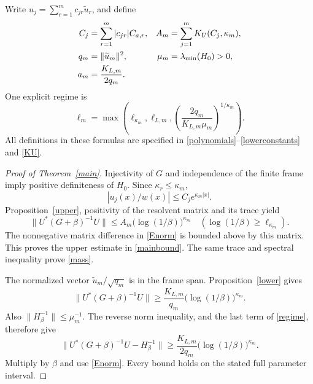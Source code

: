 \documentclass[11pt]{article}
\theoremstyle{remark}
\begin{document}
Write \(u_j=\sum_{r=1}^m c_{jr}\widetilde u_r\), and define
\begin{align}
 C_j&=\sum_{r=1}^m|c_{jr}|C_{a,r},&
 A_m&=\sum_{j=1}^mK_U(C_j,\kappa_m),\notag\\
 q_m&=\|\widetilde u_m\|^2,&
 \mu_m&=\lambda_{\min}(H_0)>0,\notag\\
 a_m&=\frac{K_{L,m}}{2q_m}.\label{frameconstants}
\end{align}
One explicit regime is
\begin{equation}\label{regime}
 \ell_m=\max\left(\ell_{\kappa_m},\ell_{L,m},
                  \left(\frac{2q_m}{K_{L,m}\mu_m}\right)^{1/\kappa_m}
             \right).
\end{equation}
All definitions in these formulas are specified in
\eqref{polynomials}--\eqref{lowerconstants} and \eqref{KU}.

\begin{proof}[Proof of Theorem~\ref{main}]
Injectivity of \(G\) and independence of the finite frame imply
positive definiteness of \(H_0\). Since \(\kappa_r\le\kappa_m\),
\[
 |u_j(x)/w(x)|\le C_j e^{\kappa_m|x|}.
\]
Proposition~\ref{upper}, positivity of the resolvent matrix and
its trace yield
\[
 \|U^*(G+\beta)^{-1}U\|
     \le A_m\bigl(\log(1/\beta)\bigr)^{\kappa_m}
                         \quad(\log(1/\beta)\ge\ell_{\kappa_m}).
\]
The nonnegative matrix difference in \eqref{Enorm} is bounded
above by this matrix. This proves the upper estimate in
\eqref{mainbound}. The same trace and spectral inequality prove
\eqref{mass}.

The normalized vector \(\widetilde u_m/\sqrt{q_m}\) is in the
frame span. Proposition~\ref{lower} gives
\[
 \|U^*(G+\beta)^{-1}U\|
       \ge\frac{K_{L,m}}{q_m}
                      \bigl(\log(1/\beta)\bigr)^{\kappa_m}.
\]
Also \(\|H_\beta^{-1}\|\le\mu_m^{-1}\).
The reverse norm inequality, and the last term of \eqref{regime},
therefore give
\[
 \|U^*(G+\beta)^{-1}U-H_\beta^{-1}\|
       \ge\frac{K_{L,m}}{2q_m}
                      \bigl(\log(1/\beta)\bigr)^{\kappa_m}.
\]
Multiply by \(\beta\) and use \eqref{Enorm}.
Every bound holds on the stated full parameter interval.
\end{proof}
\end{document}
